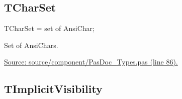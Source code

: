 \documentclass{report}
\newif\ifpdf
\begin{document}
\subsection*{TCharSet}
\fi
\label{PasDoc_Types-TCharSet}
\begin{list}{}{
\setlength{\itemindent}{0cm}
\setlength{\listparindent}{0cm}
\setlength{\leftmargin}{\evensidemargin}
\addtolength{\leftmargin}{\tmplength}
\settowidth{\labelsep}{X}
\addtolength{\leftmargin}{\labelsep}
\setlength{\labelwidth}{\tmplength}
}
\item[\textbf{Declaration}\hfill]
\ifpdf
\begin{flushleft}
\fi
\begin{ttfamily}
TCharSet = set of AnsiChar;\end{ttfamily}

\ifpdf
\end{flushleft}
\fi

\par
\item[\textbf{Description}]
Set of AnsiChars.\par
\href{https://github.com/pasdoc/pasdoc/blob/master/source/component/PasDoc_Types.pas#L86}{Source: source/component/PasDoc{\_}Types.pas (line 86).}

\end{list}
\ifpdf
\subsection*{\large{\textbf{TImplicitVisibility}}\normalsize\hspace{1ex}\hrulefill}
\else
\end{document}
